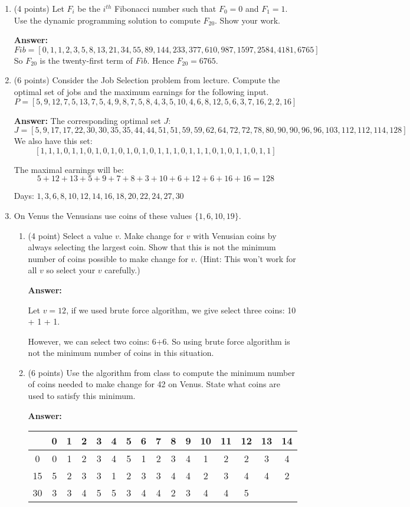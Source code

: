 \documentclass[paper=a4, fontsize=11pt]{scrartcl}
\numberwithin{equation}{section}		%
\numberwithin{figure}{section}			%
\numberwithin{table}{section}				%
\begin{document}
\begin{enumerate}
\item (4 points) Let $F_i$ be the $i^{th}$ Fibonacci number such that $F_0 = 0$ and $F_1 = 1$.  Use the dynamic programming solution to compute $F_{20}$.  Show your work.

\textbf{Answer:}
\[
Fib=[0,1,1,2,3,5,8,13,21,34,55,89,144,233,377,610,987,1597,2584,4181,6765]
\]
So $F_{20}$ is the twenty-first term of $Fib$. Hence $F_{20} = 6765$.


\item (6 points) Consider the Job Selection problem from lecture.  Compute the optimal set of jobs and the maximum earnings for the following input.
\[
P=[5,9,12,7,5,13,7,5,4,9,8,7,5,8,4,3,5,10,4,6,8,12,5,6,3,7,16,2,2,16]
\]

\textbf{Answer:}
The corresponding optimal set $J$:
\noindent
\[
J=[5,9,17,17,22,30,30,35,35,44,44,51,51,59,59,62,64,72,72,78,80,90,90,96,96,103,112,112,114,128]
\]
We also have this set:
\[
[1,1,1,0,1,1,0,1,0,1,0,1,0,1,0,1,1,1,0,1,1,1,0,1,0,1,1,0,1,1]
\]

The maximal earnings will be:
$$5+12+13+5+9+7+8+3+10+6+12+6+16+16 = 128$$

Days: $1,3,6,8,10,12,14,16,18,20,22,24,27,30$


\item On Venus the Venusians use coins of these values $\{1,6,10,19\}$.
\begin{enumerate}
\item (4 point) Select a value $v$.  Make change for $v$ with Venusian coins by always selecting the largest coin.  Show that this is not the minimum number of coins possible to make change for $v$.  (Hint: This won't work for all $v$ so select your $v$ carefully.)

\textbf{Answer:}

Let $v= 12$, if we used brute force algorithm, we give select three coins: 10 + 1 + 1.

However, we can select two coins: 6+6. So using brute force algorithm is not the minimum number of coins in this situation. 


\item (6 points) Use the algorithm from class to compute the minimum number of coins needed to make change for 42 on Venus.  State what coins are used to satisfy this minimum.

\textbf{Answer:}

\noindent
\begin{center}
	\begin{tabular}{||c||c|c|c|c|c|c|c|c|c|c|c|c|c|c|c||} 
		\hline
		& 0 & 1 & 2 & 3 & 4 & 5 & 6 & 7 & 8 & 9 & 10 & 11 & 12 & 13 & 14  \\
		\hline\hline
		0 & 0 & 1 & 2 & 3 & 4 & 5 & 1 & 2 & 3 & 4 & 1 & 2 & 2 & 3 & 4 \\
		\hline
		15 & 5 & 2 & 3 & 3 & 1 & 2 & 3 & 3 & 4 & 4 & 2 & 3 & 4 & 4 & 2 \\ 
		\hline
		30 & 3 & 3 & 4 & 5 & 5 & 3 & 4 & 4 & 2 & 3 & 4 & 4 & 5 & & \\
		\hline
	\end{tabular}
\end{center}


\end{enumerate}
\end{enumerate}
\end{document}
